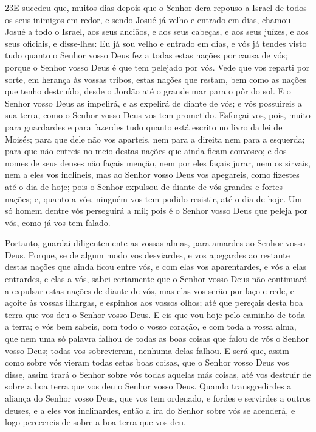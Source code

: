 \medskip

\lettrine{23} E sucedeu que, muitos dias depois que o Senhor
dera repouso a Israel de todos os seus inimigos em redor, e sendo
Josué já velho e entrado em dias, chamou Josué a todo o Israel,
aos seus anciãos, e aos seus cabeças, e aos seus juízes, e aos seus
oficiais, e disse-lhes: Eu já sou velho e entrado em dias, e vós
já tendes visto tudo quanto o Senhor vosso Deus fez a todas estas
nações por causa de vós; porque o Senhor vosso Deus é que tem
pelejado por vós. Vede que vos reparti por sorte, em herança às
vossas tribos, estas nações que restam, bem como as nações que tenho
destruído, desde o Jordão até o grande mar para o pôr do sol. E
o Senhor vosso Deus as impelirá, e as expelirá de diante de vós; e
vós possuireis a sua terra, como o Senhor vosso Deus vos tem
prometido. Esforçai-vos, pois, muito para guardardes e para
fazerdes tudo quanto está escrito no livro da lei de Moisés; para
que dele não vos aparteis, nem para a direita nem para a esquerda;
para que não entreis no meio destas nações que ainda ficam
convosco; e dos nomes de seus deuses não façais menção, nem por eles
façais jurar, nem os sirvais, nem a eles vos inclineis, mas ao
Senhor vosso Deus vos apegareis, como fizestes até o dia de hoje;
pois o Senhor expulsou de diante de vós grandes e fortes nações;
e, quanto a vós, ninguém vos tem podido resistir, até o dia de hoje.
Um só homem dentre vós perseguirá a mil; pois é o Senhor
vosso Deus que peleja por vós, como já vos tem falado.

Portanto, guardai diligentemente as vossas almas, para amardes ao
Senhor vosso Deus. Porque, se de algum modo vos desviardes, e
vos apegardes ao restante destas nações que ainda ficou entre vós, e
com elas vos aparentardes, e vós a elas entrardes, e elas a vós,
sabei certamente que o Senhor vosso Deus não continuará a
expulsar estas nações de diante de vós, mas elas vos serão por laço
e rede, e açoite às vossas ilhargas, e espinhos aos vossos olhos;
até que pereçais desta boa terra que vos deu o Senhor vosso Deus.
E eis que vou hoje pelo caminho de toda a terra; e vós bem
sabeis, com todo o vosso coração, e com toda a vossa alma, que nem
uma só palavra falhou de todas as boas coisas que falou de vós o
Senhor vosso Deus; todas vos sobrevieram, nenhuma delas falhou.
E será que, assim como sobre vós vieram todas estas boas
coisas, que o Senhor vosso Deus vos disse, assim trará o Senhor
sobre vós todas aquelas más coisas, até vos destruir de sobre a boa
terra que vos deu o Senhor vosso Deus. Quando transgredirdes
a aliança do Senhor vosso Deus, que vos tem ordenado, e fordes e
servirdes a outros deuses, e a eles vos inclinardes, então a ira do
Senhor sobre vós se acenderá, e logo perecereis de sobre a boa terra
que vos deu.

